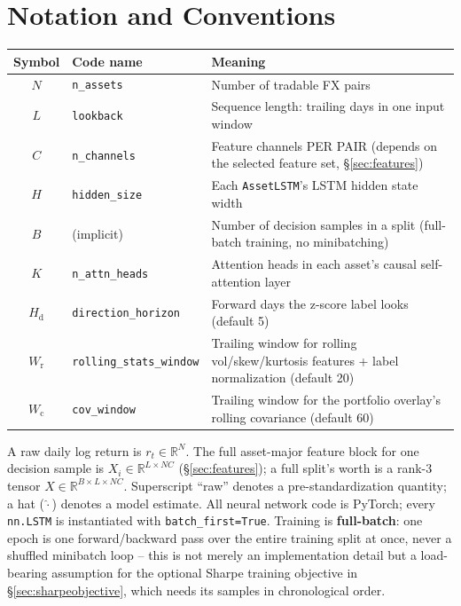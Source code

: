 \documentclass[11pt]{article}
\newcommand{\code}[1]{\texttt{\small #1}}
\begin{document}
\section{Notation and Conventions}
\label{sec:notation}

\begin{center}
\renewcommand{\arraystretch}{1.25}
\begin{tabular}{@{}cll@{}}
\toprule
\textbf{Symbol} & \textbf{Code name} & \textbf{Meaning} \\
\midrule
$N$ & \texttt{n\_assets} & Number of tradable FX pairs \\
$L$ & \texttt{lookback} & Sequence length: trailing days in one input window \\
$C$ & \texttt{n\_channels} & Feature channels PER PAIR (depends on the selected feature set, \S\ref{sec:features}) \\
$H$ & \texttt{hidden\_size} & Each \texttt{AssetLSTM}'s LSTM hidden state width \\
$B$ & (implicit) & Number of decision samples in a split (full-batch training, no minibatching) \\
$K$ & \texttt{n\_attn\_heads} & Attention heads in each asset's causal self-attention layer \\
$H_{\text{d}}$ & \texttt{direction\_horizon} & Forward days the z-score label looks (default 5) \\
$W_{\text{r}}$ & \texttt{rolling\_stats\_window} & Trailing window for rolling vol/skew/kurtosis features + label normalization (default 20) \\
$W_{\text{c}}$ & \texttt{cov\_window} & Trailing window for the portfolio overlay's rolling covariance (default 60) \\
\bottomrule
\end{tabular}
\end{center}

A raw daily log return is $r_t \in \mathbb{R}^N$. The full asset-major feature block for
one decision sample is $X_i \in \mathbb{R}^{L \times NC}$ (\S\ref{sec:features}); a full
split's worth is a rank-3 tensor $X \in \mathbb{R}^{B \times L \times NC}$. Superscript
``raw'' denotes a pre-standardization quantity; a hat ($\hat{\cdot}$) denotes a model
estimate. All neural network code is PyTorch; every \code{nn.LSTM} is instantiated with
\code{batch\_first=True}. Training is \textbf{full-batch}: one epoch is one forward/backward
pass over the entire training split at once, never a shuffled minibatch loop -- this is not
merely an implementation detail but a load-bearing assumption for the optional Sharpe
training objective in \S\ref{sec:sharpeobjective}, which needs its samples in chronological
order.
\end{document}
